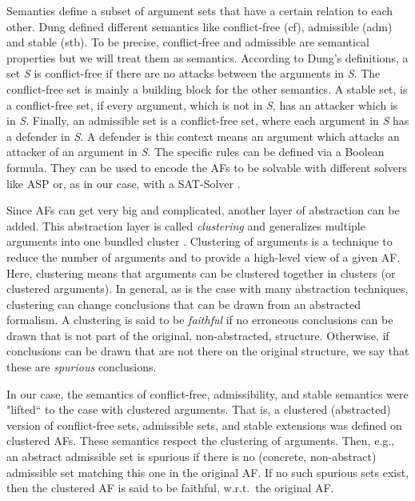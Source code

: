 Semantics define a subset of argument sets that have a certain relation to each other. Dung defined different semantics \cite{Dung1995-DUNOTA-2} like conflict-free (cf), admissible (adm) and stable (stb). To be precise, conflict-free and admissible are semantical properties but we will treat them as semantics. According to Dung's definitions, a set \textit{S} is conflict-free if there are no attacks between the arguments in \textit{S}. The conflict-free set is mainly a building block for the other semantics.
A stable set, is a conflict-free set, if every argument, which is not in \textit{S}, has an attacker which is in \textit{S}.
Finally, an admissible set is a conflict-free set, where each argument in \textit{S} has a defender in \textit{S}. A defender is this context means an argument which attacks an attacker of an argument in \textit{S}.
The specific rules can be defined via a Boolean formula. They can be used to encode the AFs to be solvable with different solvers like \ac{ASP} \cite{DBLP:journals/corr/abs-1301-1388} or, as in our case, with a \ac{SAT-Solver} \cite{DBLP:journals/amai/AmgoudD13}.


Since AFs can get very big and complicated, another layer of abstraction can be added. This abstraction layer is called \emph{clustering} and generalizes multiple arguments into one bundled cluster \cite{DBLP:conf/kr/SaribaturW21}. Clustering of arguments is a technique to reduce the number of arguments and to provide a high-level view of a given AF. Here, clustering means that arguments can be clustered together in clusters (or clustered arguments). In general, as is the case with many abstraction techniques, clustering can change conclusions that can be drawn from an abstracted formalism. A clustering is said to be \emph{faithful} if no erroneous conclusions can be drawn that is not part of the original, non-abstracted, structure. Otherwise, if conclusions can be drawn that are not there on the original structure, we say that these are \emph{spurious} conclusions.

In our case, the semantics of conflict-free, admissibility, and stable semantics were "lifted`` to the case with clustered arguments. That is, a clustered (abstracted) version of conflict-free sets, admissible sets, and stable extensions was defined on clustered AFs. These semantics respect the clustering of arguments. Then, e.g., an abstract admissible set is spurious if there is no (concrete, non-abstract) admissible set matching this one in the original AF. If no such spurious sets exist, then the clustered AF is said to be faithful, w.r.t.\ the original AF.




